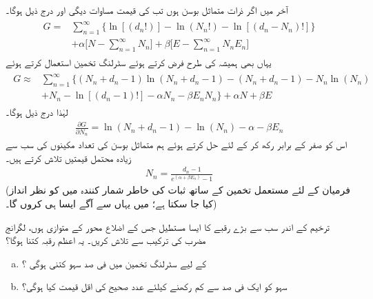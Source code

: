 آخر میں اگر ذرات متماثل بوسن ہوں تب  کی قیمت مساوات  دیگی اور درج ذیل ہوگا۔
\begin{gather}
\begin{aligned}
G =& \sum_{n = 1}^{\infty} \{ \ln[(d_n !) ] - \ln(N_n !) - \ln[(d_n - N_n) ! ] \} \\
&+ \alpha \big [ N - \sum_{n = 1}^{\infty} N_n \big ] + \beta \big [ E - \sum_{n = 1}^{\infty} N_n E_n \big ]
\end{aligned}
\end{gather}
یہاں بھی ہمیشہ کی طرح  فرض کرتے ہوئے سٹرلنگ تخمین استعمال کرتے ہوئے 
\begin{gather}
\begin{aligned}
G \approx &\sum_{n = 1}^{\infty} \{ (N_n + d_n - 1) \ln(N_n + d_n - 1) - (N_n + d_n - 1) - N_n \ln(N_n) \\
&+ N_n - \ln[(d_n - 1) !] - \alpha N_n - \beta E_n N_n \} + \alpha N + \beta E
\end{aligned}
\end{gather}
لہٰذا درج ذیل ہوگا۔
\begin{align}
\frac{\partial G}{\partial N_n} = \ln(N_n + d_n - 1) - \ln(N_n) - \alpha - \beta E_n
\end{align}
اس کو صفر کے برابر رکھ کر  کے لئے حل کرتے ہوئے ہم متماثل بوسن کی تعداد مکینوں کی سب سے زیادہ محتمل قیمتیں تلاش کرتے ہیں۔ 
\begin{align}\label{مساوات_متماثل_سب_سے_زیادہ_محتمل_برائے_بوسن}
N_n = \frac{d_n - 1}{e^{(\alpha + \beta E_n)} - 1}
\end{align}
(فرمیان کے لئے مستعمل تخمین کے ساتھ ثبات کی خاطر شمار کنندہ میں  کو نظر انداز کیا جا سکتا ہے؛ میں یہاں سے آگے ایسا ہی کروں گا۔)

ترخیم  کے اندر سب سے بڑے رقبے کا ایسا مستطیل جس کے اضلاع محور کے متوازی ہوں، لگرانج مضرب کی ترکیب سے تلاش کریں۔ یہ اعظم رقبہ کتنا ہوگا؟ 
\begin{enumerate}[a.]
\item
{} کے لیے سٹرلنگ تخمین میں فی صد سہو کتنی ہوگی ؟
\item
سہو کو ایک فی صد سے کم رکھنے کیلئے عدد صحیح  کی اقل قیمت کیا ہوگی؟ 
\end{enumerate}



